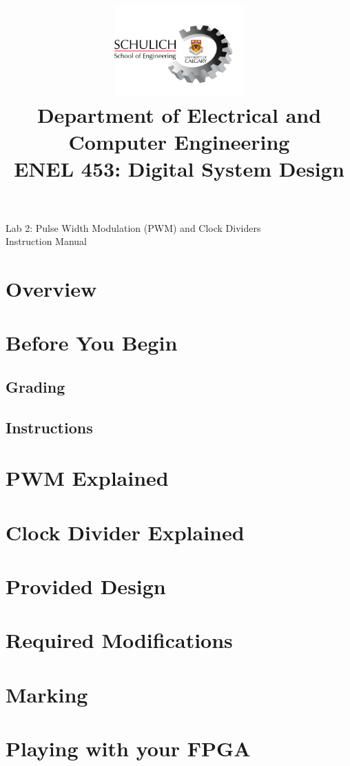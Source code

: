 \documentclass{article}
\title{
  \includegraphics[width=5cm]{Images/Logo.png}\\
  \normalsize Department of Electrical and Computer Engineering\\
  ENEL 453: Digital System Design
}
\date{\semester}
\makeatletter
\renewcommand{\maketitle}{%
  \begin{center}
    {\@title}
    \vspace{1cm} %
    {\@date}
  \end{center}
}
\makeatother
\begin{document}
\centering

\maketitle
\large Lab 2: Pulse Width Modulation (PWM) and Clock Dividers  \\
Instruction Manual

\raggedright
\normalsize
\section{Overview}


\section{Before You Begin}

    \subsection{Grading}

    \subsection{Instructions}


\section{PWM Explained}

\section{Clock Divider Explained}

\section{Provided Design}

\section{Required Modifications}


\section{Marking}

\section{Playing with your FPGA}

\end{document}
